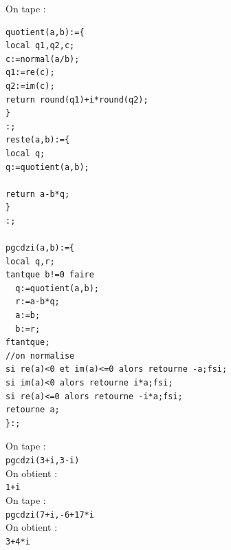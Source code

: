 \documentclass[a4paper,11pt]{book}
\begin{document}
On tape :
\begin{verbatim}
quotient(a,b):={
local q1,q2,c;
c:=normal(a/b);
q1:=re(c);
q2:=im(c);
return round(q1)+i*round(q2);
}
:;
reste(a,b):={
local q;
q:=quotient(a,b);

return a-b*q;
}
:;

pgcdzi(a,b):={
local q,r;
tantque b!=0 faire
  q:=quotient(a,b);
  r:=a-b*q;
  a:=b;
  b:=r;
ftantque;
//on normalise
si re(a)<0 et im(a)<=0 alors retourne -a;fsi;
si im(a)<0 alors retourne i*a;fsi;
si re(a)<=0 alors retourne -i*a;fsi;
retourne a;
}:;
\end{verbatim}
On tape :\\
{\tt pgcdzi(3+i,3-i)}\\
On obtient :\\
{\tt 1+i}\\
On tape :\\
{\tt pgcdzi(7+i,-6+17*i}\\
On obtient :\\
{\tt 3+4*i}
\end{document}
